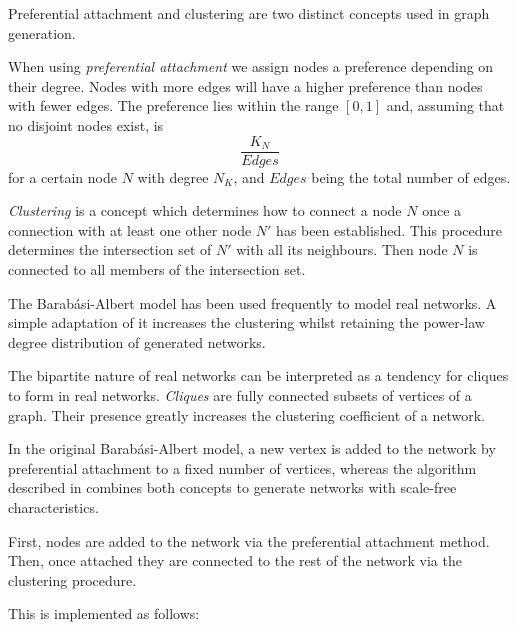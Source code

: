 \documentclass[a4paper,11pt,titlepage]{article}
\begin{document}
Preferential attachment and clustering are two distinct concepts used
in graph generation.

When using \emph{preferential attachment} we assign nodes a preference
depending on their degree. Nodes with more edges will have a higher
preference than nodes with fewer edges. The preference lies within the
range $[0,1]$ and, assuming that no disjoint nodes exist,
is
\[ \frac{K_N}{Edges} \]
for a certain node $N$ with degree $N_K$,
and $Edges$ being the total number of edges.

\emph{Clustering} is a concept which determines how to connect a
node $N$ once a connection with at least one other node $N'$ has
been established. This procedure determines the intersection set
of $N'$ with all its neighbours. Then node $N$ is connected to
all members of the intersection set.

The Barab\'{a}si-Albert model has been used frequently to model real
networks. A simple adaptation of it increases the clustering whilst
retaining the power-law degree distribution of generated networks.

The bipartite nature of real networks can be interpreted as a
tendency for cliques to form in real networks. \emph{Cliques} are
fully connected subsets of vertices of a graph. Their presence
greatly increases the clustering coefficient of a network.

In the original Barab\'{a}si-Albert model, a new vertex is added to
the network by preferential attachment to a fixed number of
vertices, whereas the algorithm described in \cite{oconn11} combines
both concepts to generate networks with scale-free characteristics.

First, nodes are added to the network via the preferential attachment
method. Then, once attached they are connected to the rest of the
network via the clustering procedure.

This is implemented as follows:
\end{document}
